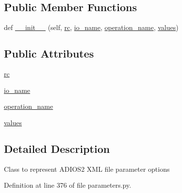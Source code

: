 \subsection*{Public Member Functions}
\begin{DoxyCompactItemize}
\item 
def \hyperlink{classcodar_1_1cheetah_1_1parameters_1_1_param_a_d_i_o_s2_x_m_l_af754fa92a1b477dc6fedce88a9375d53}{\+\_\+\+\_\+init\+\_\+\+\_\+} (self, \hyperlink{classcodar_1_1cheetah_1_1parameters_1_1_param_a_d_i_o_s2_x_m_l_a81924cb9239a749e787cf68de5dbe508}{rc}, \hyperlink{classcodar_1_1cheetah_1_1parameters_1_1_param_a_d_i_o_s2_x_m_l_a383f4e23cc27b608e08ccab3dcc9163d}{io\+\_\+name}, \hyperlink{classcodar_1_1cheetah_1_1parameters_1_1_param_a_d_i_o_s2_x_m_l_af23a158cb70680fa31d789cf1e1210b1}{operation\+\_\+name}, \hyperlink{classcodar_1_1cheetah_1_1parameters_1_1_param_a_d_i_o_s2_x_m_l_a031e1eec0b1e5d8e6415157b0026ceea}{values})
\end{DoxyCompactItemize}
\subsection*{Public Attributes}
\begin{DoxyCompactItemize}
\item 
\hyperlink{classcodar_1_1cheetah_1_1parameters_1_1_param_a_d_i_o_s2_x_m_l_a81924cb9239a749e787cf68de5dbe508}{rc}
\item 
\hyperlink{classcodar_1_1cheetah_1_1parameters_1_1_param_a_d_i_o_s2_x_m_l_a383f4e23cc27b608e08ccab3dcc9163d}{io\+\_\+name}
\item 
\hyperlink{classcodar_1_1cheetah_1_1parameters_1_1_param_a_d_i_o_s2_x_m_l_af23a158cb70680fa31d789cf1e1210b1}{operation\+\_\+name}
\item 
\hyperlink{classcodar_1_1cheetah_1_1parameters_1_1_param_a_d_i_o_s2_x_m_l_a031e1eec0b1e5d8e6415157b0026ceea}{values}
\end{DoxyCompactItemize}


\subsection{Detailed Description}
\begin{DoxyVerb}Class to represent ADIOS2 XML file parameter options
\end{DoxyVerb}
 

Definition at line 376 of file parameters.\+py.



